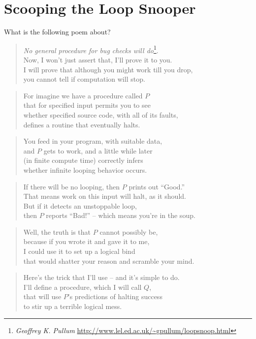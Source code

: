 \section{Scooping the Loop Snooper}
What is the following poem about?

\begin{verse}
\emph{No general procedure for bug checks will do}\footnote{%
\emph{Geoffrey K. Pullum}
\url{http://www.lel.ed.ac.uk/~gpullum/loopsnoop.html}%
}.\\
Now, I won't just assert that, I’ll prove it to you.\\
I will prove that although you might work till you drop,\\
you cannot tell if computation will stop.
\end{verse}
\begin{verse}
For imagine we have a procedure called \(P\)\\
that for specified input permits you to see\\
whether specified source code, with all of its faults,\\
defines a routine that eventually halts.
\end{verse}
\begin{verse}
You feed in your program, with suitable data,\\
and \(P\) gets to work, and a little while later\\
(in finite compute time) correctly infers\\
whether infinite looping behavior occurs.
\end{verse}
\begin{verse}
If there will be no looping, then \(P\) prints out ``Good.''\\
That means work on this input will halt, as it should.\\
But if it detects an unstoppable loop,\\
then \(P\) reports ``Bad!'' -- which means you're in the soup.
\end{verse}
\begin{verse}
Well, the truth is that \(P\) cannot possibly be,\\
because if you wrote it and gave it to me,\\
I could use it to set up a logical bind\\
that would shatter your reason and scramble your mind.
\end{verse}
\begin{verse}
Here's the trick that I’ll use -- and it's simple to do.\\
I’ll define a procedure, which I will call \(Q\),\\
that will use \(P\)'s predictions of halting success\\
to stir up a terrible logical mess.
\end{verse}
